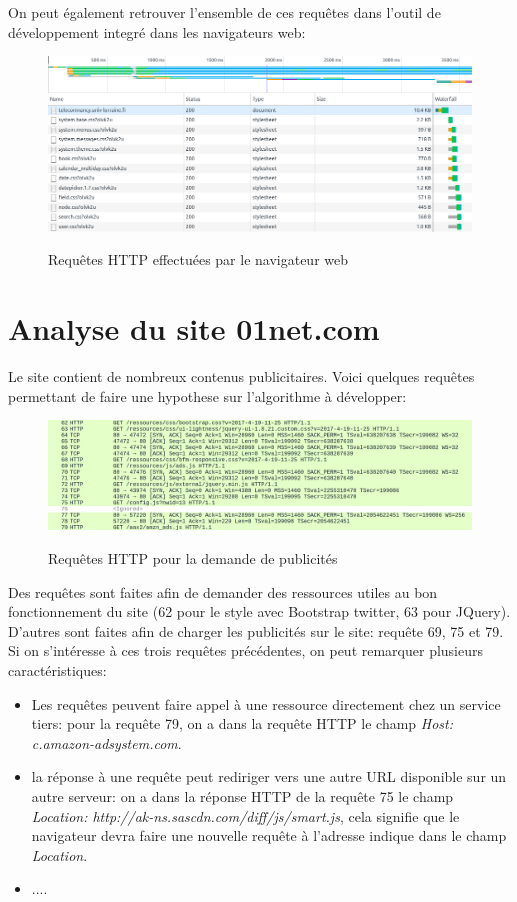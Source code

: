 \documentclass[a4paper,11pt, oneside]{book}
\def\widthImage{1}
\begin{document}
		On peut également retrouver l'ensemble de ces requêtes dans l'outil de développement integré dans les navigateurs web:

		\begin{figure} [htbp]
			\centering
			\includegraphics[width=\widthImage\textwidth]{3.png}\\
			\caption{Requêtes HTTP effectuées par le navigateur web}
		\end{figure}


	\clearpage
	\section{Analyse du site 01net.com}
		Le site contient de nombreux contenus publicitaires. Voici quelques requêtes permettant
		de faire une hypothese sur l'algorithme à développer:

		\begin{figure} [htbp]
			\centering
			\includegraphics[width=\widthImage\textwidth]{4.png}\\
			\caption{Requêtes HTTP pour la demande de publicités}
		\end{figure}

		Des requêtes sont faites afin de demander des ressources utiles au bon fonctionnement du site (62 pour le style avec Bootstrap twitter, 63 pour JQuery).
		D'autres sont faites afin de charger les publicités sur le site: requête 69, 75 et 79.
		Si on s'intéresse à ces trois requêtes précédentes, on peut remarquer plusieurs caractéristiques:
		\begin{itemize}
			\item Les requêtes peuvent faire appel à une ressource directement chez un service tiers: pour la requête 79,
			on a dans la requête HTTP le champ  \textit{Host: c.amazon-adsystem.com}.
			\item la réponse à une requête peut rediriger vers une autre URL disponible sur un autre serveur:
			on a dans la réponse HTTP de la requête 75 le champ \textit{Location: http://ak-ns.sascdn.com/diff/js/smart.js}, cela
			signifie que le navigateur devra faire une nouvelle requête à l'adresse indique dans le champ \textit{Location}.
			\item ....
		\end{itemize}
\end{document}
